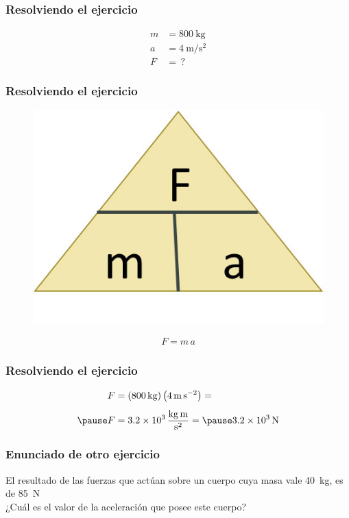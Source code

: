 \documentclass[14pt]{beamer}
\begin{document}
\begin{frame}
\frametitle{Resolviendo el ejercicio}
\pause
\begin{align*}
m &= \SI{800}{\kilo\gram} \\[0.5em]
a &= \SI{4}{\meter\per\square\second} \\[0.5em]
F &= \, ?
\end{align*}
\end{frame}
\begin{frame}
\frametitle{Resolviendo el ejercicio}
\pause
\begin{figure}
    \centering
    \includegraphics[scale=1]{Imagenes/Newton_11.jpg}
\end{figure}
\pause
\begin{align*}
F = m \, a
\end{align*}
\end{frame}
\begin{frame}
\frametitle{Resolviendo el ejercicio}
\pause
\begin{eqnarray*}
\begin{aligned}
F &= \left( \SI{800}{\kilo\gram} \right) \left( \SI{4}{\meter\per\square\second} \right) = \\[0.5em] \pause
F &= \SI[per-mode=fraction]{3.2d3}{\kilo\gram\meter\per\square\second} = \pause \SI{3.2d3}{\newton}
\end{aligned}
\end{eqnarray*}
\end{frame}    
\begin{frame}
\frametitle{Enunciado de otro ejercicio}
El resultado de las fuerzas que actúan sobre un cuerpo cuya masa vale \SI{40}{\kilo\gram}, es de \SI{85}{\newton}
\\
\bigskip
¿Cuál es el valor de la aceleración que posee este cuerpo?
\end{frame}
\end{document}
